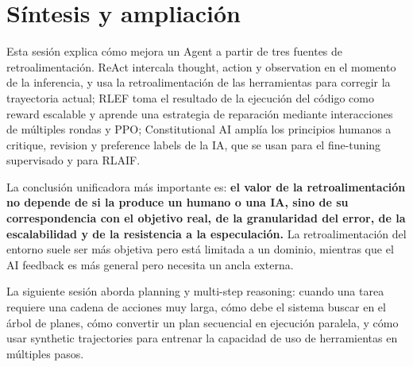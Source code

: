 \documentclass[a4paper]{article}
\begin{document}
\section{Síntesis y ampliación}

Esta sesión explica cómo mejora un Agent a partir de tres fuentes de retroalimentación. ReAct intercala thought, action y observation en el momento de la inferencia, y usa la retroalimentación de las herramientas para corregir la trayectoria actual; RLEF toma el resultado de la ejecución del código como reward escalable y aprende una estrategia de reparación mediante interacciones de múltiples rondas y PPO; Constitutional AI amplía los principios humanos a critique, revision y preference labels de la IA, que se usan para el fine-tuning supervisado y para RLAIF.

La conclusión unificadora más importante es: \textbf{el valor de la retroalimentación no depende de si la produce un humano o una IA, sino de su correspondencia con el objetivo real, de la granularidad del error, de la escalabilidad y de la resistencia a la especulación.} La retroalimentación del entorno suele ser más objetiva pero está limitada a un dominio, mientras que el AI feedback es más general pero necesita un ancla externa.

La siguiente sesión aborda planning y multi-step reasoning: cuando una tarea requiere una cadena de acciones muy larga, cómo debe el sistema buscar en el árbol de planes, cómo convertir un plan secuencial en ejecución paralela, y cómo usar synthetic trajectories para entrenar la capacidad de uso de herramientas en múltiples pasos.
\end{document}
